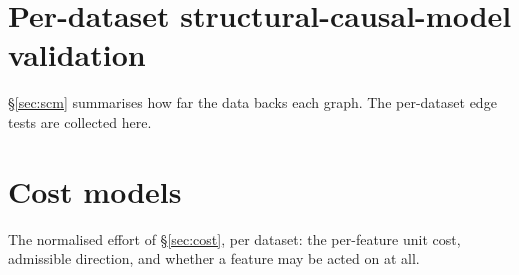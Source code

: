 \documentclass[11pt]{article}
\begin{document}
\section{Per-dataset structural-causal-model validation}
\label{app:scm}
\S\ref{sec:scm} summarises how far the data backs each graph. The per-dataset
edge tests are collected here.





\section{Cost models}
\label{app:cost}
The normalised effort of \S\ref{sec:cost}, per dataset: the per-feature unit
cost, admissible direction, and whether a feature may be acted on at all.




\end{document}
